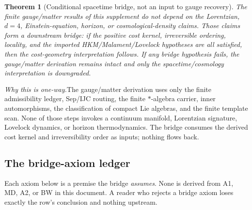 \documentclass[11pt]{article}
\newtheorem{theorem}{Theorem}[section]
\theoremstyle{definition}
\begin{document}
\begin{theorem}[Conditional spacetime bridge, not an input to gauge recovery]
\label{thm:conditional_spacetime_bridge}
The finite gauge/matter results of this supplement do not depend on the
Lorentzian, $d=4$, Einstein-equation, horizon, or cosmological-density
claims.  Those claims form a downstream bridge: if the positive cost kernel,
irreversible ordering, locality, and the imported HKM/Malament/Lovelock
hypotheses are all satisfied, then the cost-geometry interpretation follows.
If any bridge hypothesis fails, the gauge/matter derivation remains intact
and only the spacetime/cosmology interpretation is downgraded.
\end{theorem}

\noindent\textit{Why this is one-way.}\quad The gauge/matter derivation uses
only the finite admissibility ledger, Sep/IJC routing, the finite
$*$-algebra carrier, inner automorphisms, the classification of compact Lie
algebras, and the finite template scan.  None of those steps invokes a
continuum manifold, Lorentzian signature, Lovelock dynamics, or horizon
thermodynamics.  The bridge consumes the derived cost kernel and
irreversibility order as inputs; nothing flows back.

\subsection{The bridge-axiom ledger}
\label{sec:bridge_axiom_ledger}

Each axiom below is a premise the bridge \emph{assumes}.  None is derived
from A1, MD, A2, or BW in this document.  A reader who rejects a bridge
axiom loses exactly the row's conclusion and nothing upstream.
\end{document}
